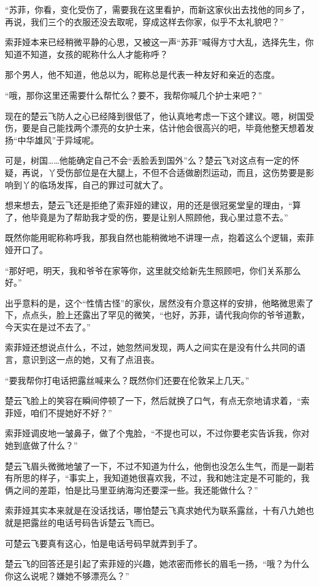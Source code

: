 “苏菲，你看，变化受伤了，需要我在这里看护，而新这家伙出去找他的同乡了，再说，我们三个的衣服还没去取呢，穿成这样去你家，似乎不太礼貌吧？”

索菲娅本来已经稍微平静的心思，又被这一声“苏菲”喊得方寸大乱，选择先生，你知道不知道，女孩的昵称什么人才能称呼？

那个男人，他不知道，他总以为，昵称总是代表一种友好和亲近的态度。

“哦，那你这里还需要什么帮忙么？要不，我帮你喊几个护士来吧？”

现在的楚云飞防人之心已经降到很低了，他认真地考虑一下这个建议。嗯，树国受伤，要是自己能找两个漂亮的女护士来，估计他会很高兴的吧，毕竟他整天想着发扬“中华雄风”于异域呢。

可是，树国……他能确定自己不会“丢脸丢到国外”么？楚云飞对这点有一定的怀疑，再说，丫受伤部位是在大腿上，不但不合适做剧烈运动，而且，这伤势要是影响到丫的临场发挥，自己的罪过可就大了。

想来想去，楚云飞还是拒绝了索菲娅的建议，用的还是很冠冕堂皇的理由，“算了，他毕竟是为了帮助我才受的伤，要是让别人照顾他，我心里过意不去。”

既然你能用昵称称呼我，那我自然也能稍微地不讲理一点，抱着这么个逻辑，索菲娅开口了。

“那好吧，明天，我和爷爷在家等你，这里就交给新先生照顾吧，你们关系那么好。”

出乎意料的是，这个“性情古怪”的家伙，居然没有介意这样的安排，他略微思索了下，点点头，脸上还露出了罕见的微笑，“也好，苏菲，请代我向你的爷爷道歉，今天实在是过不去了。”

索菲娅还想说点什么，不过，她忽然间发现，两人之间实在是没有什么共同的语言，意识到这一点的她，又有了点沮丧。

“要我帮你打电话把露丝喊来么？既然你们还要在伦敦呆上几天。”

楚云飞脸上的笑容在瞬间停顿了一下，然后就换了口气，有点无奈地请求着，“索菲娅，咱们不提她好不好？”

索菲娅调皮地一皱鼻子，做了个鬼脸，“不提也可以，不过你要老实告诉我，你对她到底做了什么？”

楚云飞眉头微微地皱了一下，不过不知道为什么，他倒也没怎么生气，而是一副若有所思的样子，“事实上，我知道她很喜欢我，不过，我和她注定是不可能的，我俩之间的差距，怕是比马里亚纳海沟还要深一些。我还能做什么？”

索菲娅其实本来就是在没话找话，哪怕楚云飞真求她代为联系露丝，十有八九她也就是把露丝的电话号码告诉楚云飞而已。

可楚云飞要真有这心，怕是电话号码早就弄到手了。

楚云飞的回答还是引起了索菲娅的兴趣，她浓密而修长的眉毛一扬，“哦？为什么你这么说呢？嫌她不够漂亮么？”

